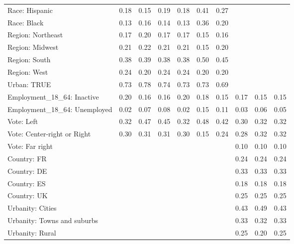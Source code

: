 \begin{tabular}[t]{llllllllll}
Race: Hispanic & 0.18 & 0.15 & 0.19 & 0.18 & 0.41 & 0.27 &  &  & \\
Race: Black & 0.13 & 0.16 & 0.14 & 0.13 & 0.36 & 0.20 &  &  & \\
\addlinespace
Region: Northeast & 0.17 & 0.20 & 0.17 & 0.17 & 0.15 & 0.16 &  &  & \\
Region: Midwest & 0.21 & 0.22 & 0.21 & 0.21 & 0.15 & 0.20 &  &  & \\
Region: South & 0.38 & 0.39 & 0.38 & 0.38 & 0.50 & 0.45 &  &  & \\
Region: West & 0.24 & 0.20 & 0.24 & 0.24 & 0.20 & 0.20 &  &  & \\
\addlinespace
Urban: TRUE & 0.73 & 0.78 & 0.74 & 0.73 & 0.73 & 0.69 &  &  & \\
\addlinespace
Employment\_18\_64: Inactive & 0.20 & 0.16 & 0.16 & 0.20 & 0.18 & 0.15 & 0.17 & 0.15 & 0.15\\
Employment\_18\_64: Unemployed & 0.02 & 0.07 & 0.08 & 0.02 & 0.15 & 0.11 & 0.03 & 0.06 & 0.05\\
\addlinespace
Vote: Left & 0.32 & 0.47 & 0.45 & 0.32 & 0.48 & 0.42 & 0.30 & 0.32 & 0.32\\
Vote: Center-right or Right & 0.30 & 0.31 & 0.31 & 0.30 & 0.15 & 0.24 & 0.28 & 0.32 & 0.32\\
Vote: Far right &  &  &  &  &  &  & 0.10 & 0.10 & 0.10\\
\addlinespace
Country: FR &  &  &  &  &  &  & 0.24 & 0.24 & 0.24\\
Country: DE &  &  &  &  &  &  & 0.33 & 0.33 & 0.33\\
Country: ES &  &  &  &  &  &  & 0.18 & 0.18 & 0.18\\
Country: UK &  &  &  &  &  &  & 0.25 & 0.25 & 0.25\\
\addlinespace
Urbanity: Cities &  &  &  &  &  &  & 0.43 & 0.49 & 0.43\\
Urbanity: Towns and suburbs &  &  &  &  &  &  & 0.33 & 0.32 & 0.33\\
Urbanity: Rural &  &  &  &  &  &  & 0.25 & 0.20 & 0.25\\
\bottomrule
\end{tabular}